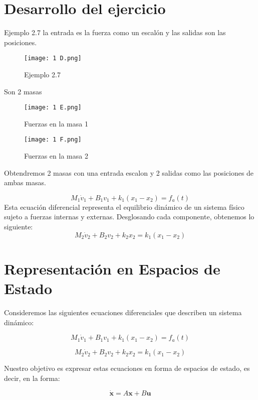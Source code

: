 \documentclass{report}
\begin{document}
\section{Desarrollo del ejercicio}

Ejemplo 2.7 la entrada es la fuerza como un escalón y las salidas son las posiciones.

\begin{figure}[H]
    \centering
    \texttt{[image: 1 D.png]}
    \caption{Ejemplo 2.7}
    \label{fig:diagrama_modelo}
\end{figure}
Son 2 masas 
\begin{figure}[H]
    \centering
    \texttt{[image: 1 E.png]}
    \caption{Fuerzas en la masa 1}
    \label{fig:diagrama_modelo}
\end{figure}
\begin{figure}[H]
    \centering
    \texttt{[image: 1 F.png]}
    \caption{Fuerzas en la masa 2}
    \label{fig:diagrama_modelo}
\end{figure}
Obtendremos 2 masas con una entrada escalon y 2 salidas como las posiciones de ambas masas.

\[
M_1 \dot{v}_1 + B_1 v_1 + k_1 (x_1 - x_2) = f_a(t)
\]
Esta ecuación diferencial representa el equilibrio dinámico de un sistema físico sujeto a fuerzas internas y externas. Desglosando cada componente, obtenemos lo siguiente:
\[
M_2 \dot{v}_2 + B_2 v_2 + k_2 x_2 = k_1 (x_1 - x_2)
\]

\section{Representación en Espacios de Estado}

Consideremos las siguientes ecuaciones diferenciales que describen un sistema dinámico:

\begin{equation}
M_1 \dot{v}_1 + B_1 v_1 + k_1 (x_1 - x_2) = f_a(t)
\label{eq:eq1}
\end{equation}

\begin{equation}
M_2 \dot{v}_2 + B_2 v_2 + k_2 x_2 = k_1 (x_1 - x_2)
\label{eq:eq2}
\end{equation}

Nuestro objetivo es expresar estas ecuaciones en forma de espacios de estado, es decir, en la forma:

\[
\dot{\mathbf{x}} = A\mathbf{x} + B\mathbf{u}
\]
\end{document}
